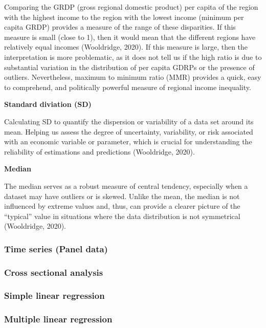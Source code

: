 \documentclass[
  a4paper,
  DIV=11,
  numbers=noendperiod]{scrartcl}
\begin{document}
Comparing the GRDP (gross regional domestic product) per capita of the
region with the highest income to the region with the lowest income
(minimum per capita GRDP) provides a measure of the range of these
disparities. If this measure is small (close to 1), then it would mean
that the different regions have relatively equal incomes (Wooldridge,
2020). If this measure is large, then the interpretation is more
problematic, as it does not tell us if the high ratio is due to
substantial variation in the distribution of per capita GDRPs or the
presence of outliers. Nevertheless, maximum to minimum ratio (MMR)
provides a quick, easy to comprehend, and politically powerful measure
of regional income inequality.

\textbf{Standard diviation (SD)}

Calculating SD to quantify the dispersion or variability of a data set
around its mean. Helping us assess the degree of uncertainty,
variability, or risk associated with an economic variable or parameter,
which is crucial for understanding the reliability of estimations and
predictions (Wooldridge, 2020).

\textbf{Median}

The median serves as a robust measure of central tendency, especially
when a dataset may have outliers or is skewed. Unlike the mean, the
median is not influenced by extreme values and, thus, can provide a
clearer picture of the ``typical'' value in situations where the data
distribution is not symmetrical (Wooldridge, 2020).

\hypertarget{time-series-panel-data}{%
\subsubsection{\texorpdfstring{\textbf{Time series (Panel
data)}}{Time series (Panel data)}}\label{time-series-panel-data}}

\hypertarget{cross-sectional-analysis}{%
\subsubsection{Cross sectional
analysis}\label{cross-sectional-analysis}}

\hypertarget{simple-linear-regression}{%
\subsubsection{Simple linear
regression}\label{simple-linear-regression}}

\hypertarget{multiple-linear-regression}{%
\subsubsection{Multiple linear
regression}\label{multiple-linear-regression}}
\end{document}
